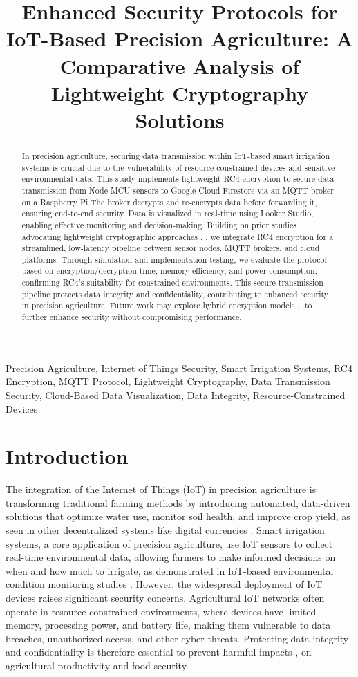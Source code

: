 \documentclass[conference]{IEEEtran}
\title{Enhanced Security Protocols for IoT-Based Precision Agriculture: A Comparative Analysis of Lightweight Cryptography Solutions}
\author{
    \IEEEauthorblockN{Author Name\IEEEauthorrefmark{1}, Author Name\IEEEauthorrefmark{2}}
    \IEEEauthorblockA{
        \IEEEauthorrefmark{1}Department, University, City, Country \\
        \IEEEauthorrefmark{2}Department, University, City, Country \\
        Email: author1@university.edu, author2@university.edu
    }
}
\begin{document}
\maketitle

\begin{abstract}
In precision agriculture, securing data transmission within IoT-based smart irrigation systems is crucial due to the vulnerability of resource-constrained devices and sensitive environmental data. This study implements lightweight RC4 encryption to secure data transmission from Node MCU sensors to Google Cloud Firestore via an MQTT broker on a Raspberry Pi.The broker decrypts and re-encrypts data before forwarding it, ensuring end-to-end security. Data is visualized in real-time using Looker Studio, enabling effective monitoring and decision-making. Building on prior studies advocating lightweight cryptographic approaches \cite{ref1}, \cite{ref2}, we integrate RC4 encryption for a streamlined, low-latency pipeline between sensor nodes, MQTT brokers, and cloud platforms. Through simulation and implementation testing, we evaluate the protocol based on encryption/decryption time, memory efficiency, and power consumption, confirming RC4's suitability for constrained environments. This secure transmission pipeline protects data integrity and confidentiality, contributing to enhanced security in precision agriculture. Future work may explore hybrid encryption models \cite{ref9}, \cite{ref10}.to further enhance security without compromising performance.
\end{abstract}

\begin{IEEEkeywords}
 Precision Agriculture, Internet of Things Security, Smart Irrigation Systems, RC4 Encryption, MQTT Protocol, Lightweight Cryptography, Data Transmission Security, Cloud-Based Data Visualization, Data Integrity, Resource-Constrained Devices
\end{IEEEkeywords}

\section{Introduction}
The integration of the Internet of Things (IoT) in precision agriculture is transforming traditional farming methods by introducing automated, data-driven solutions that optimize water use, monitor soil health, and improve crop yield, as seen in other decentralized systems like digital currencies \cite{ref6}. Smart irrigation systems, a core application of precision agriculture, use IoT sensors to collect real-time environmental data, allowing farmers to make informed decisions on when and how much to irrigate, as demonstrated in IoT-based environmental condition monitoring studies \cite{ref13}. However, the widespread deployment of IoT devices raises significant security concerns. Agricultural IoT networks often operate in resource-constrained environments, where devices have limited memory, processing power, and battery life, making them vulnerable to data breaches, unauthorized access, and other cyber threats. Protecting data integrity and confidentiality is therefore essential to prevent harmful impacts \cite{ref4}, \cite{ref7} on agricultural productivity and food security.
\end{document}
